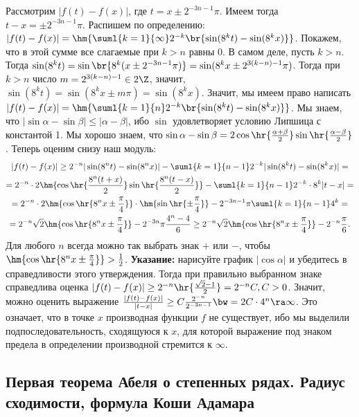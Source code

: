 \documentclass[a4paper]{article}
\begin{document}
Рассмотрим $|f(t)-f(x)|$, где $t=x \pm 2^{-3n-1}\pi$. Имеем тогда $t-x=\pm 2^{-3n-1}\pi$. Распишем по определению:
$|f(t)-f(x)|=\hm{\suml{k=1}{\infty} 2^{-k}\br{\sin (8^kt)-\sin(8^kx)}} $. Покажем, что в этой сумме все слагаемые при $k>n$ равны 0.
В самом деле, пусть $k>n$. Тогда $\sin(8^kt)=\sin\br{8^k(x \pm 2^{-3n-1}\pi)}=\sin(8^k x \pm 2^{3(k-n)-1}\pi)$. Тогда при
$k>n$ число $m=2^{3(k-n)-1} \in 2\Z$, значит, $\sin(8^kt)=\sin(8^kx\pm m\pi)=\sin(8^kx)$. Значит, мы имеем право написать
$|f(t)-f(x)|=\hm{\suml{k=1}{n} 2^{-k}\br{\sin (8^kt)-\sin(8^kx)}} $. Мы знаем, что $|\sin \alpha - \sin \beta| \le |\alpha - \beta|$,
ибо $\sin$ удовлетворяет условию Липшица с константой 1. Мы хорошо знаем, что $\sin \alpha - \sin \beta =
2\cos\hr{ \frac{\alpha+\beta}{2}} \sin\hr{ \frac{\alpha-\beta}{2}} $. Теперь оценим снизу наш модуль:
\begin{multline*}
|f(t)-f(x)| \ge 2^{-n}|\sin (8^nt)-\sin(8^nx)| - \suml{k=1}{n-1}2^{-k}|\sin (8^kt)-\sin(8^kx)|=\\
=2^{-n} \cdot 2\hm{\cos\hr{ \frac{8^n(t+x)}{2}} \sin\hr{ \frac{8^n(t-x)}{2}}} - \suml{k=1}{n-1} 2^{-k}\cdot 8^k|t-x|=\\
=2^{-n} \cdot 2\hm{\cos\hr{ 8^nx\pm \frac{\pi}{4}}} \cdot\hm{\sin\hr{ \pm \frac{\pi}{4}}} - 2^{-3n-1}\pi\suml{k=1}{n-1} 4^k=\\
=2^{-n} \sqrt{2}\hm{\cos\hr{ 8^nx\pm \frac{\pi}{4}}} - 2^{-3n}\pi\frac{4^n-4}{6} \ge
2^{-n} \sqrt{2}\hm{\cos\hr{ 8^nx\pm \frac{\pi}{4}}} - 2^{-n}\frac{\pi}{6}.
\end{multline*}
Для любого $n$ всегда можно так выбрать знак $+$ или $-$, чтобы $\hm{\cos\hr{ 8^nx \pm \frac{\pi}{4}}} > \frac{1}{2}$.
\textbf{Указание:} нарисуйте график $|\cos \alpha|$ и убедитесь в справедливости этого утверждения.
Тогда при правильно выбранном знаке справедлива оценка
$|f(t)-f(x)| \ge 2^{-n}\hr{ \frac{\sqrt{2}-1}{2}} = 2^{-n}C, C > 0$. Значит, можно оценить выражение
$\frac{|f(t)-f(x)|}{|t-x|} \ge C\frac{2^{-n}}{2^{-3n-1}}\bw=2C \cdot 4^n \ra \infty$. Это означает, что
в точке $x$ производная функции $f$ не существует, ибо мы выделили подпоследовательность, сходящуюся к $x$, для
которой выражение под знаком предела в определении производной стремится к $\infty$.

\subsection{Первая теорема Абеля о степенных рядах. Радиус сходимости, формула Коши Адамара}
\end{document}
